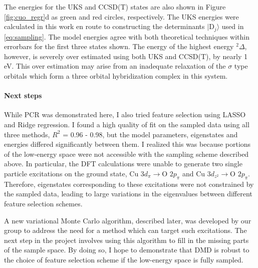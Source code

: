 \documentclass[12pt]{article}
\begin{document}
The energies for the UKS and CCSD(T) \cite{Xian2000} states are also shown in Figure \ref{fig:cuo_regr}d as green and red circles, respectively.
The UKS energies were calculated in this work en route to constructing the determinants $|\text{D}_j\rangle$ used in \eqref{eq:sampling}.
The model energies agree with both theoretical techniques within errorbars for the first three states shown.
The energy of the highest energy $^2\Delta$, however, is severely over estimated using both UKS and CCSD(T), by nearly 1 eV.
This over estimation may arise from an inadequate relaxation of the $\sigma$ type orbitals which form a three orbital hybridization complex in this system.

\vspace{-10pt}
\paragraph{Next steps}
While PCR was demonstrated here, I also tried feature selection using LASSO and Ridge regression. 
I found a high quality of fit on the sampled data using all three methods, $R^2$ = 0.96 - 0.98, but the model parameters, eigenstates and energies differed significantly between them.
I realized this was because portions of the low-energy space were not accessible with the sampling scheme described above.
In particular, the DFT calculations were unable to generate two single particle excitations on the ground state, $\text{Cu } 3d_\pi \rightarrow \text{O } 2p_\pi$ and $\text{Cu } 3d_{z^2} \rightarrow \text{O } 2p_\pi$.
Therefore, eigenstates corresponding to these excitations were not constrained by the sampled data, leading to large variations in the eigenvalues between different feature selection schemes.

A new variational Monte Carlo algorithm, described later, was developed by our group to address the need for a method which can target such excitations.
The next step in the project involves using this algorithm to fill in the missing parts of the sample space.
By doing so, I hope to demonstrate that DMD is robust to the choice of feature selection scheme if the low-energy space is fully sampled.
\end{document}

